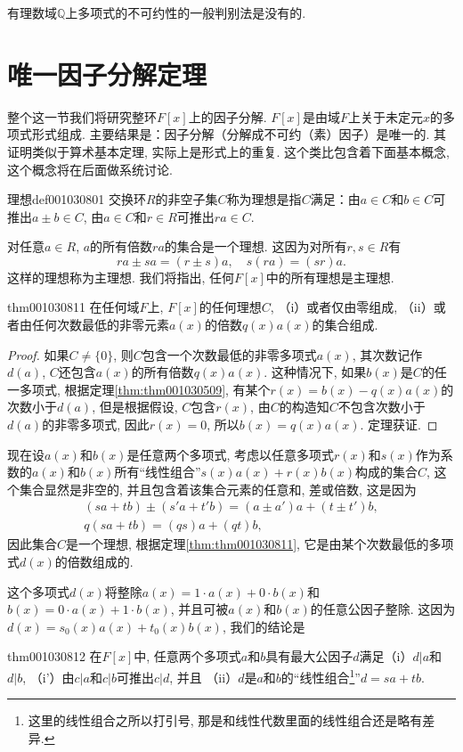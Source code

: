 有理数域$\mathbb{Q}$上多项式的不可约性的一般判别法是没有的. 


\section{唯一因子分解定理}\label{section0010308}
整个这一节我们将研究整环$F[x]$上的因子分解. $F[x]$是由域$F$上关于未定元$x$的多项式形式组成. 主要结果是：因子分解（分解成不可约（素）因子）是唯一的. 其证明类似于算术基本定理, 实际上是形式上的重复. 这个类比包含着下面基本概念, 这个概念将在后面做系统讨论. 

\begin{definition}{理想}{def001030801}
交换环$R$的非空子集$C$称为理想是指$C$满足：由$a \in C$和$b \in C$可推出$a \pm b \in C$, 由$a \in C$和$r \in R$可推出$ra \in C$. 
\end{definition}

对任意$a \in R$, $a$的所有倍数$ra$的集合是一个理想. 这因为对所有$r, s \in R$有
\[
ra \pm sa = (r \pm s)a, \quad s(ra) = (sr)a.
\]
这样的理想称为主理想. 我们将指出, 任何$F[x]$中的所有理想是主理想. 
\begin{theorem}{}{thm001030811}
在任何域$F$上, $F[x]$的任何理想$C$, （i）或者仅由零组成, （ii）或者由任何次数最低的非零元素$a(x)$的倍数$q(x)a(x)$的集合组成. 
\end{theorem}

\begin{proof}
如果$C \neq \{0\}$, 则$C$包含一个次数最低的非零多项式$a(x)$, 其次数记作$d(a)$, $C$还包含$a(x)$的所有倍数$q(x)a(x)$. 这种情况下, 如果$b(x)$是$C$的任一多项式, 根据定理\ref{thm:thm001030509}, 有某个$r(x)=b(x)-q(x)a(x)$的次数小于$d(a)$, 但是根据假设, $C$包含$r(x)$, 由$C$的构造知$C$不包含次数小于$d(a)$的非零多项式, 因此$r(x)=0$, 所以$b(x)=q(x)a(x)$. 定理获证. 
\end{proof}

现在设$a(x)$和$b(x)$是任意两个多项式, 考虑以任意多项式$r(x)$和$s(x)$作为系数的$a(x)$和$b(x)$所有“线性组合”$s(x)a(x)+r(x)b(x)$构成的集合$C$, 这个集合显然是非空的, 并且包含着该集合元素的任意和, 差或倍数, 这是因为
\begin{gather*}
(sa+tb) \pm (s'a+t'b) = (a \pm a')a+(t \pm t')b,\\
q(sa+tb) = (qs)a + (qt)b,
\end{gather*}
因此集合$C$是一个理想, 根据定理\ref{thm:thm001030811}, 它是由某个次数最低的多项式$d(x)$的倍数组成的. 

这个多项式$d(x)$将整除$a(x) = 1 \cdot a(x) + 0 \cdot b(x)$和$b(x) = 0 \cdot a(x) + 1\cdot b(x)$, 并且可被$a(x)$和$b(x)$的任意公因子整除. 这因为$d(x)=s_0(x)a(x)+t_0(x)b(x)$, 我们的结论是
\begin{theorem}{}{thm001030812}
在$F[x]$中, 任意两个多项式$a$和$b$具有最大公因子$d$满足（i）$d|a$和$d|b$, （i'）由$c|a$和$c|b$可推出$c|d$, 并且 （ii）$d$是$a$和$b$的“线性组合\footnote{这里的线性组合之所以打引号, 那是和线性代数里面的线性组合还是略有差异. }”$d=sa+tb$. 
\end{theorem}

